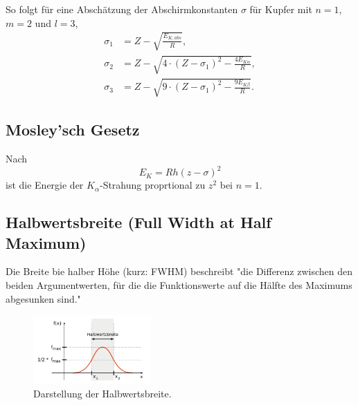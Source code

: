 So folgt für eine Abschätzung der Abschirmkonstanten $\sigma$ für Kupfer
mit $n=1$,$m=2$ und $l=3$,
\begin{align}
    \sigma_1 &= Z-\sqrt{\frac{E_{K,abs}}{R}},\\
    \sigma_2 &= Z-\sqrt{4\cdot (Z-\sigma_1)^2-\frac{4E_{K\alpha}}{R}}, \\
    \sigma_3 &= Z-\sqrt{9\cdot(Z-\sigma_1)^2-\frac{9E_{K\beta}}{R}} .
    \label{eqn:sigma}
\end{align}

\subsection{Mosley'sch Gesetz}
Nach 
\begin{equation}
    E_K=Rh(z-\sigma)^2
    \label{eqn:mos}
\end{equation}
ist die Energie der $K_{\alpha}$-Strahung proprtional zu $z^2$ bei $n=1$.

\subsection{Halbwertsbreite (Full Width at Half Maximum)}
Die Breite bie halber Höhe (kurz: FWHM) beschreibt "die Differenz zwischen 
den beiden Argumentwerten, für die die Funktionswerte auf die 
Hälfte des Maximums abgesunken sind."\cite{wiki2}
\begin{figure}[H]
    \centering
    \includegraphics[width=0.4\textwidth]{plots/Halbwertsbreite.png}
    \caption{Darstellung der Halbwertsbreite.\cite{wiki2}}
\end{figure}
\label{subsec:halbwert}

